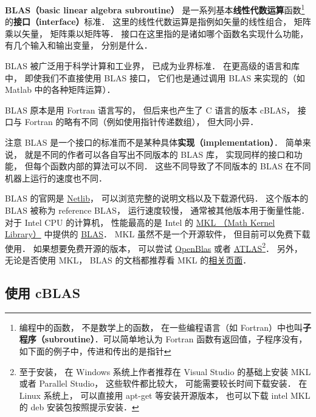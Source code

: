 

\textbf{BLAS（basic linear algebra subroutine）} 是一系列基本\textbf{线性代数运算}函数\footnote{编程中的函数， 不是数学上的函数， 在一些编程语言（如 Fortran）中也叫\textbf{子程序（subroutine）}．可以简单地认为 Fortran 函数有返回值，子程序没有，如下面的例子中，传进和传出的是指针}的\textbf{接口（interface）}标准．  这里的线性代数运算是指例如矢量的线性组合， 矩阵乘以矢量， 矩阵乘以矩阵等． 接口在这里指的是诸如哪个函数名实现什么功能， 有几个输入和输出变量， 分别是什么．

BLAS 被广泛用于科学计算和工业界， 已成为业界标准． 在更高级的语言和库中， 即使我们不直接使用 BLAS 接口， 它们也是通过调用 BLAS 来实现的（如 Matlab 中的各种矩阵运算）．

BLAS 原本是用 Fortran 语言写的， 但后来也产生了 C 语言的版本 cBLAS， 接口与 Fortran 的略有不同（例如使用指针传递数组）， 但大同小异．

注意 BLAS 是一个接口的标准而不是某种具体\textbf{实现（implementation）}． 简单来说， 就是不同的作者可以各自写出不同版本的 BLAS 库， 实现同样的接口和功能， 但每个函数内部的算法可以不同．  这些不同导致了不同版本的 BLAS 在不同机器上运行的速度也不同．

BLAS 的官网是 \href{http://www.netlib.org/blas/}{Netlib}， 可以浏览完整的说明文档以及下载源代码． 这个版本的 BLAS 被称为 reference BLAS， 运行速度较慢， 通常被其他版本用于衡量性能． 对于 Intel CPU 的计算机， 性能最高的是 Intel 的 \href{https://software.intel.com/en-us/mkl}{MKL （Math Kernel Library）} 中提供的 \href{https://software.intel.com/en-us/mkl-developer-reference-c-blas-and-sparse-blas-routines}{BLAS}． MKL 虽然不是一个开源软件， 但目前可以免费下载使用． 如果想要免费开源的版本， 可以尝试 \href{https://www.openblas.net/}{OpenBlas} 或者 \href{https://sourceforge.net/projects/math-atlas/}{ATLAS}\footnote{至于安装， 在 Windows 系统上作者推荐在 Visual Studio 的基础上安装 MKL 或者 Parallel Studio， 这些软件都比较大， 可能需要较长时间下载安装． 在 Linux 系统上， 可以直接用 apt-get 等安装开源版本， 也可以下载 intel MKL 的 deb 安装包按照提示安装．}． 另外， 无论是否使用 MKL， BLAS 的文档都推荐看 MKL 的\href{https://software.intel.com/en-us/mkl-developer-reference-c-blas-and-sparse-blas-routines}{相关页面}．

\subsection{使用 cBLAS}

